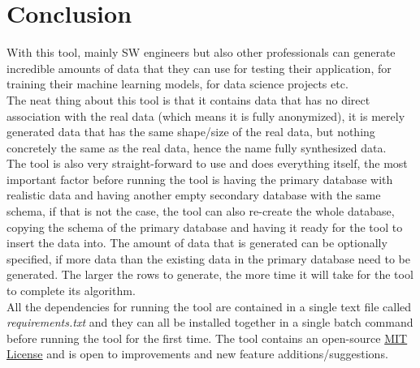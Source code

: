 \section{Conclusion}
With this tool, mainly SW engineers but also other professionals can generate incredible amounts of data that they can use for testing their application, for training their machine learning models, for data science projects etc.\\
\newline
The neat thing about this tool is that it contains data that has no direct association with the real data (which means it is fully anonymized), it is merely generated data that has the same shape/size of the real data, but nothing concretely the same as the real data, hence the name fully synthesized data.\\
\newline
The tool is also very straight-forward to use and does everything itself, the most important factor before running the tool is having the primary database with realistic data and having another empty secondary database with the same schema, if that is not the case, the tool can also re-create the whole database, copying the schema of the primary database and having it ready for the tool to insert the data into. The amount of data that is generated can be optionally specified, if more data than the existing data in the primary database need to be generated. The larger the rows to generate, the more time it will take for the tool to complete its algorithm.\\
All the dependencies for running the tool are contained in a single text file called \textit{requirements.txt} and they can all be installed together in a single batch command before running the tool for the first time. The tool contains an open-source \href{https://opensource.org/licenses/MIT}{MIT License} and is open to improvements and new feature additions/suggestions.

